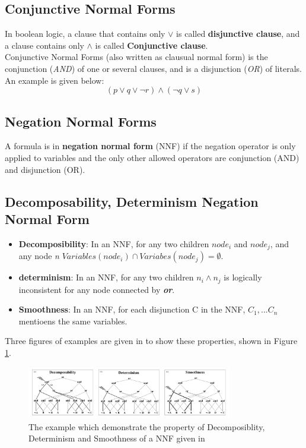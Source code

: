     \subsection{Conjunctive Normal Forms}
    In boolean logic, a clause that contains only $\vee$ is called \textbf{disjunctive clause}, and a clause contains only $\wedge$ is called \textbf{Conjunctive clause}.\\
    Conjunctive Normal Forms (also written as clausual normal form) is  the conjunction (\textit{AND}) of one or several clauses, and is a disjunction (\textit{OR}) of literals. An example is given below: $$(p \vee q \vee \neg r) \wedge (\neg q \vee s)$$
    \subsection{Negation Normal Forms}
    A formula is in \textbf{negation normal form}  (NNF) if the negation operator is only applied to variables and the only other allowed operators are conjunction (AND) and disjunction (OR).
    
    \subsection{Decomposability, Determinism Negation Normal Form}
    \begin{itemize}
        \item \textbf{Decomposibility}: In an NNF, for any two children $node_{i}$ and $node_{j}$, and any node \textit{n} $Variables(node_{i}) \cap Variabes(node_{j}) = \emptyset$.
        \item \textbf{determinism}: In an NNF, for any two children $n_{i} \wedge n_{j}$ is logically inconsistent for any node connected by \textbf{\textit{or}}.
        \item \textbf{Smoothness}: In an NNF, for each disjunction C in the NNF, $C_{1}, ... C_{n}$ mentioens the same variables.
    \end{itemize}
    Three figures of examples are given in \cite{2002language-map} to show these properties, shown in Figure \ref{fig:demo-DDNNF}.
    \begin{figure}
        \centering
        \includegraphics[width = 0.8\textwidth]{pic/DDNNF.png}
        \caption{The example which demonstrate the property of Decomposiblity, Determinism and Smoothness of a NNF given in \cite{2002language-map}}
        \label{fig:demo-DDNNF}
    \end{figure}
    
